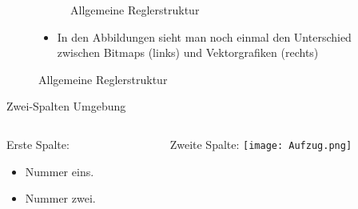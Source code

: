 \begin{frame}[fragile]
\begin{figure}[htbp]
\begin{subfigure}[b]{0.45\textwidth}
\begin{externalize}
                \end{externalize}
                \caption*{Allgemeine Reglerstruktur} %
                \label{fig:myfigure2b}
        \end{subfigure}
        \label{fig:myfigure2}

	\begin{itemize}
		\item In den Abbildungen sieht man noch einmal den Unterschied zwischen Bitmaps (links) und Vektorgrafiken (rechts)
	\end{itemize}
\end{figure} 		
 		
\end{frame}



\begin{frame}{Zwei-Spalten Umgebung}


\begin{columns} %
	\begin{column}{0.5\textwidth}
		Erste Spalte: 
		\begin{itemize}
			\item Nummer eins.
			\item Nummer zwei.
		\end{itemize}
	\end{column}
	\begin{column}{0.45\textwidth}
		Zweite Spalte:
		\texttt{[image: Aufzug.png]}
	\end{column}
\end{columns}


\end{frame}

